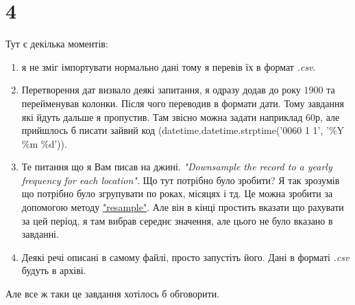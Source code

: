 \documentclass[14pt]{extarticle}
\begin{document}
\section*{4}
Тут є декілька моментів:
\begin{enumerate}
\item я не зміг імпортувати нормально дані тому я перевів їх в формат \textit{.csv}.
\item Перетворення дат визвало деякі запитання, я одразу додав до року $ 1900 $ та перейменував колонки. Після чого переводив в формати дати. Тому завдання які йдуть дальше я пропустив. Там звісно можна задати наприклад 60р, але прийшлось б писати зайвий код (datetime.datetime.strptime('0060 1 1', '\%Y \%m \%d')).
\item Те питання що я Вам писав на джині. \textit{"Downsample the record to a yearly frequency for each location"}. Що тут потрібно було зробити? Я так зрозумів що потрібно було згрупувати по роках, місяцях і тд. Це можна зробити за допомогою методу \href{https://pandas.pydata.org/docs/reference/api/pandas.DataFrame.resample.html}{"resample"}. Але він в кінці простить вказати що рахувати за цей період, я там вибрав середнє значення, але цього не було вказано в завданні.
\item Деякі речі описані в самому файлі, просто запустіть його. Дані в форматі \textit{.csv} будуть в архіві.
\end{enumerate}
Але все ж таки це завдання хотілось б обговорити.
\end{document}
